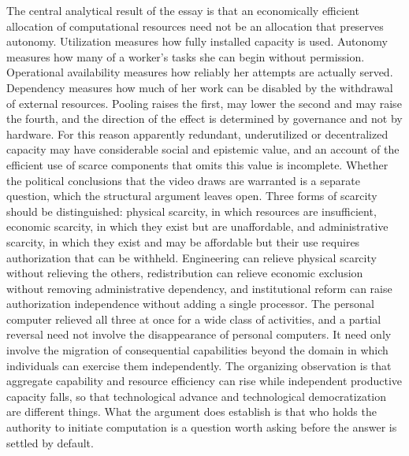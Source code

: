 \documentclass[11pt]{article}
\theoremstyle{plain}
\theoremstyle{definition}
\begin{document}
The central analytical result of the essay is that an economically efficient allocation of computational resources need not be an allocation that preserves autonomy. Utilization measures how fully installed capacity is used. Autonomy measures how many of a worker's tasks she can begin without permission. Operational availability measures how reliably her attempts are actually served. Dependency measures how much of her work can be disabled by the withdrawal of external resources. Pooling raises the first, may lower the second and may raise the fourth, and the direction of the effect is determined by governance and not by hardware. For this reason apparently redundant, underutilized or decentralized capacity may have considerable social and epistemic value, and an account of the efficient use of scarce components that omits this value is incomplete. Whether the political conclusions that the video draws are warranted is a separate question, which the structural argument leaves open. Three forms of scarcity should be distinguished: physical scarcity, in which resources are insufficient, economic scarcity, in which they exist but are unaffordable, and administrative scarcity, in which they exist and may be affordable but their use requires authorization that can be withheld. Engineering can relieve physical scarcity without relieving the others, redistribution can relieve economic exclusion without removing administrative dependency, and institutional reform can raise authorization independence without adding a single processor. The personal computer relieved all three at once for a wide class of activities, and a partial reversal need not involve the disappearance of personal computers. It need only involve the migration of consequential capabilities beyond the domain in which individuals can exercise them independently. The organizing observation is that aggregate capability and resource efficiency can rise while independent productive capacity falls, so that technological advance and technological democratization are different things. What the argument does establish is that who holds the authority to initiate computation is a question worth asking before the answer is settled by default.
\end{document}
